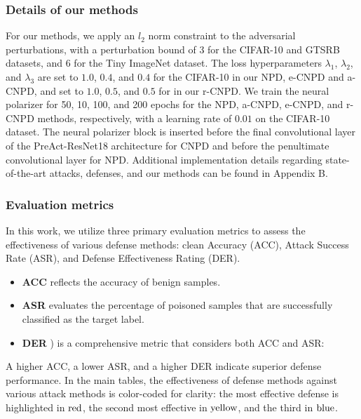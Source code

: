 \subsubsection{Details of our methods}
For our methods, we apply an $l_2$ norm constraint to the adversarial perturbations, with a perturbation bound of 3 for the CIFAR-10 and GTSRB datasets, and 6 for the Tiny ImageNet dataset. The loss hyperparameters $\lambda_1$, $\lambda_2$, and $\lambda_3$ are set to $1.0$, $0.4$, and $0.4$ for the CIFAR-10 in our NPD, e-CNPD and a-CNPD, and set to $1.0$, $0.5$, and $0.5$ for in our r-CNPD. We train the neural polarizer for 50, 10, 100, and 200 epochs for the NPD, a-CNPD, e-CNPD, and r-CNPD methods, respectively, with a learning rate of $0.01$ on the CIFAR-10 dataset. The neural polarizer block is inserted before the final convolutional layer of the PreAct-ResNet18 architecture for CNPD and before the penultimate convolutional layer for NPD. Additional implementation details regarding state-of-the-art attacks, defenses, and our methods can be found in Appendix B.

\subsubsection{Evaluation metrics}
In this work, we utilize three primary evaluation metrics to assess the effectiveness of various defense methods: clean Accuracy (ACC), Attack Success Rate (ASR), and Defense Effectiveness Rating (DER). 
\begin{itemize}
    \item \textbf{ACC} reflects the accuracy of benign samples.
    \item \textbf{ASR} evaluates the percentage of poisoned samples that are successfully classified as the target label.
    \item \textbf{DER} \cite{zhu2023enhancing}) is a comprehensive metric that considers both ACC and ASR:
\end{itemize}
A higher ACC, a lower ASR, and a higher DER indicate superior defense performance. 
In the main tables, the effectiveness of defense methods against various attack methods is color-coded for clarity: the most effective defense is highlighted in $\cellcolor[HTML]{F1B9B6}\text{red}$, the second most effective in $\cellcolor[HTML]{FEEBB8}\text{yellow}$, and the third in $\cellcolor[HTML]{D7E8F2}\text{blue}$.







